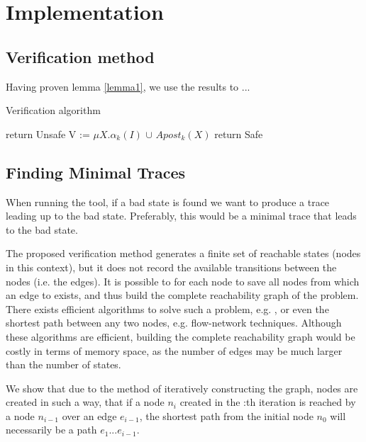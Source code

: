 
\section{Implementation}
\subsection{Verification method}
\label{alg1}
Having proven lemma \ref{lemma1}, we use the results to ... 

\begin{algorithm}
  \caption{Verification algorithm}\label{euclid}
  \begin{algorithmic}[1]
        \State return Unsafe
        \EndIf
        \State V := $\mu X.\alpha_k(I)$ $\cup$ $Apost_k(X)$
        \State return Safe     
        \EndIf
      \EndFor
\end{algorithmic}
\end{algorithm}


\subsection{Finding Minimal Traces}
When running the tool, if a bad state is found we want to produce a trace leading up to the bad state. Preferably, this would be a minimal trace that leads to the bad state.
 
The proposed verification method generates a finite set of reachable states (nodes in this context), but it does not record the available transitions between the nodes (i.e. the edges). It is possible to for each node  to save all nodes  from which an edge to  exists, and thus build the complete reachability graph of the problem. There exists efficient algorithms to solve such a problem, e.g. , or even the shortest path between any two nodes, e.g. flow-network techniques. Although these algorithms are efficient, building the complete reachability graph would be costly in terms of memory space, as the number of edges may be much larger than the number of states.

 
We show that due to the method of iteratively constructing the graph, nodes are created in such a way, that if a node $n_{i}$ created in the :th iteration is reached by a node $n_{i-1}$ over an edge $e_{i-1}$, the shortest path from the initial node $n_0$ will necessarily be a path $e_1...e_{i-1}$.
 
